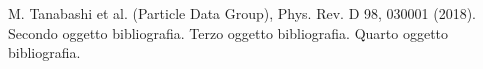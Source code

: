 \begin{thebibliography}{90}             %
\rhead[\fancyplain{}{\bfseries \leftmark}]{\fancyplain{}{\bfseries
\thepage}}
 M. Tanabashi et al. (Particle Data Group), Phys. Rev. D 98, 030001 (2018).
 Secondo oggetto bibliografia.
 Terzo oggetto bibliografia.
 Quarto oggetto bibliografia.
\end{thebibliography}

